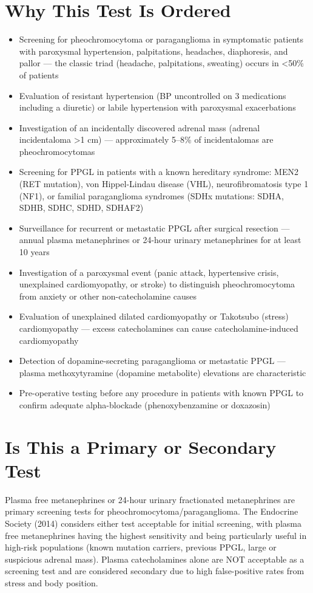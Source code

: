 \section*{Why This Test Is Ordered}
\begin{itemize}
  \item Screening for pheochromocytoma or paraganglioma in symptomatic patients with paroxysmal hypertension, palpitations, headaches, diaphoresis, and pallor --- the classic triad (headache, palpitations, sweating) occurs in <50\% of patients
  \item Evaluation of resistant hypertension (BP uncontrolled on 3 medications including a diuretic) or labile hypertension with paroxysmal exacerbations
  \item Investigation of an incidentally discovered adrenal mass (adrenal incidentaloma >1 cm) --- approximately 5--8\% of incidentalomas are pheochromocytomas
  \item Screening for PPGL in patients with a known hereditary syndrome: MEN2 (RET mutation), von Hippel-Lindau disease (VHL), neurofibromatosis type 1 (NF1), or familial paraganglioma syndromes (SDHx mutations: SDHA, SDHB, SDHC, SDHD, SDHAF2)
  \item Surveillance for recurrent or metastatic PPGL after surgical resection --- annual plasma metanephrines or 24-hour urinary metanephrines for at least 10 years
  \item Investigation of a paroxysmal event (panic attack, hypertensive crisis, unexplained cardiomyopathy, or stroke) to distinguish pheochromocytoma from anxiety or other non-catecholamine causes
  \item Evaluation of unexplained dilated cardiomyopathy or Takotsubo (stress) cardiomyopathy --- excess catecholamines can cause catecholamine-induced cardiomyopathy
  \item Detection of dopamine-secreting paraganglioma or metastatic PPGL --- plasma methoxytyramine (dopamine metabolite) elevations are characteristic
  \item Pre-operative testing before any procedure in patients with known PPGL to confirm adequate alpha-blockade (phenoxybenzamine or doxazosin)
\end{itemize}

\section*{Is This a Primary or Secondary Test}
Plasma free metanephrines or 24-hour urinary fractionated metanephrines are primary screening tests for pheochromocytoma/paraganglioma. The Endocrine Society (2014) considers either test acceptable for initial screening, with plasma free metanephrines having the highest sensitivity and being particularly useful in high-risk populations (known mutation carriers, previous PPGL, large or suspicious adrenal mass). Plasma catecholamines alone are NOT acceptable as a screening test and are considered secondary due to high false-positive rates from stress and body position.


